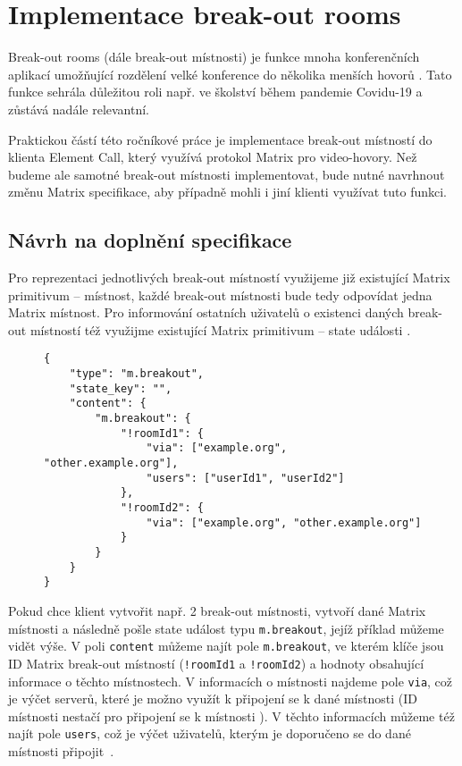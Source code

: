 \section{Implementace break-out rooms}\label{breakoutRooms}

Break-out rooms (dále break-out místnosti) je funkce mnoha konferenčních
aplikací umožňující rozdělení velké konference do několika menších hovorů
\parencite{Zoom-EnablingMeetingBreakoutRooms,Microsoft-UseBreakoutRoomsInMSTeamsMeetings}.
Tato funkce sehrála důležitou roli např. ve školství během pandemie Covidu-19
\parencite{AhmedKhalid-TheImpactOfUtilizingBreakoutRooms,Agustina-ZoomBreakoutRoomsForStudents}
a zůstává nadále relevantní.

Praktickou částí této ročníkové práce je implementace break-out místností do
klienta Element Call, který využívá protokol Matrix pro video-hovory. Než budeme
ale samotné break-out místnosti implementovat, bude nutné navrhnout změnu Matrix
specifikace, aby případně mohli i jiní klienti využívat tuto funkci.

\subsection{Návrh na doplnění specifikace}\label{breakoutRoomsMSC}

Pro reprezentaci jednotlivých break-out místností využijeme již existující
Matrix primitivum -- místnost, každé break-out místnosti bude tedy odpovídat
jedna Matrix místnost. Pro informování ostatních uživatelů o existenci daných
break-out místností též využijme existující Matrix primitivum -- state události
\parencite{GitHub-MSC3985}.

\begin{figure}[H]
    \begin{verbatim}
{
	"type": "m.breakout",
	"state_key": "",
	"content": {
		"m.breakout": {
			"!roomId1": {
				"via": ["example.org", "other.example.org"],
				"users": ["userId1", "userId2"]
			},
			"!roomId2": {
				"via": ["example.org", "other.example.org"]
			}
		}
	}
}
	\end{verbatim}
\end{figure}

Pokud chce klient vytvořit např. 2 break-out místnosti, vytvoří dané Matrix
místnosti a následně pošle state událost typu \texttt{m.breakout},
jejíž příklad můžeme vidět výše. V poli \texttt{content} můžeme najít
pole \texttt{m.breakout}, ve kterém klíče jsou ID Matrix break-out
místností (\texttt{!roomId1} a \texttt{!roomId2}) a hodnoty
obsahující informace o těchto místnostech. V informacích o místnosti najdeme
pole \texttt{via}, což je výčet serverů, které je možno využít k
připojení se k dané místnosti (ID místnosti nestačí pro připojení se k místnosti
\parencite{MatrixORG-Spec}). V těchto informacích můžeme též najít pole
\texttt{users}, což je výčet uživatelů, kterým je doporučeno se do
dané místnosti připojit~\parencite{GitHub-MSC3985}.


